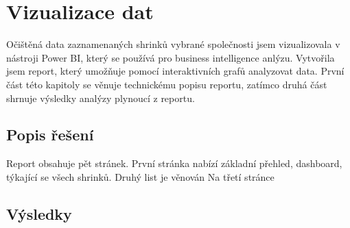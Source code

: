 \chapter{Vizualizace dat}
\label{ch:vizualizace}

Očištěná data zaznamenaných shrinků vybrané společnosti jsem vizualizovala v nástroji Power BI, který se používá pro business intelligence anlýzu. Vytvořila jsem report, který umožňuje pomocí interaktivních grafů analyzovat data. První část této kapitoly se věnuje technickému popisu reportu, zatímco druhá část shrnuje výsledky analýzy plynoucí z reportu.

\section{Popis řešení}
\label{sec:vizualizace:popis}

Report obsahuje pět stránek. První stránka nabízí základní přehled, dashboard, týkající se všech shrinků. Druhý list je věnován
Na třetí stránce


\section{Výsledky}
\label{sec:vizualizace:vysl}
